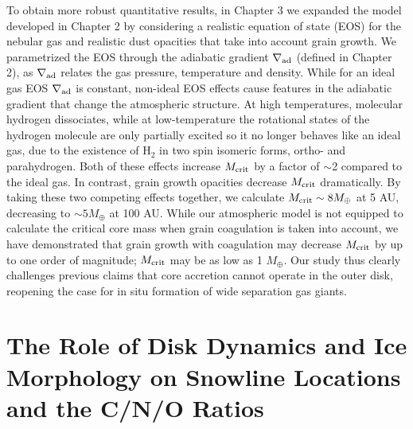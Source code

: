 To obtain more robust quantitative results, in Chapter 3 we expanded the model developed in Chapter 2 by considering a realistic equation of state (EOS) for the nebular gas and realistic dust opacities that take into account grain growth. We parametrized the EOS through the adiabatic gradient $\nabla_{\rm ad}$ (defined in Chapter 2), as $\nabla_{\rm ad}$ relates the gas pressure, temperature and density. While for an ideal gas EOS $\nabla_{\rm ad}$ is constant, non-ideal EOS effects cause features in the adiabatic gradient that change the atmospheric structure. At high temperatures, molecular hydrogen dissociates, while at low-temperature the rotational states of the hydrogen molecule are only partially excited so it no longer behaves like an ideal gas, due to the existence of H$_2$ in two spin isomeric forms, ortho- and parahydrogen. Both of these effects increase $M_{\rm crit}$ by a factor of $\sim$2 compared to the ideal gas. In contrast, grain growth opacities decrease $M_{\rm crit}$ dramatically. By taking these two competing effects together, we calculate $M_{\rm crit} \sim 8 M_{\oplus}$ at 5 AU, decreasing to $\sim 5 M_{\oplus}$ at 100 AU. While our atmospheric model is not equipped to calculate the critical core mass when grain coagulation is taken into account, we have demonstrated that grain growth with coagulation may decrease $M_{\rm crit}$ by up to one order of magnitude; $M_{\rm crit}$ may be as low as 1 $M_{\oplus}$. Our study thus clearly challenges previous claims that core accretion cannot operate in the outer disk, reopening the case for in situ formation of wide separation gas giants. 

\section{The Role of Disk Dynamics and Ice Morphology on Snowline Locations and the C/N/O Ratios}
\label{sec:volatile}

